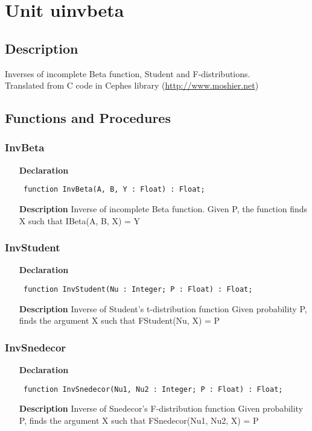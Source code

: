 \documentclass[12pt,a4paper,oneside]{report}
\newcommand{\declarationitem}[1]{\textbf{#1}}
\newcommand{\descriptiontitle}[1]{\textbf{#1}}
\newcommand{\code}[1]{\texttt{#1}}
\begin{document}
\section{Unit uinvbeta}
\label{uinvbeta}
\subsection{Description}
Inverses of incomplete Beta function, Student and F{-}distributions.\\
Translated from C code in Cephes library (\href{http://www.moshier.net}{http://www.moshier.net}) 
\subsection{Functions and Procedures}
\subsubsection{InvBeta}
\label{uinvbeta-InvBeta}
\begin{itemize}\item[\declarationitem{Declaration}\hfill]
	\begin{flushleft}
		\code{
			function InvBeta(A, B, Y : Float) : Float;}
	\end{flushleft}
	\par
	\item[\descriptiontitle{Description}]
	Inverse of incomplete Beta function. Given P, the function finds X such that IBeta(A, B, X) = Y
\end{itemize}
\subsubsection{InvStudent}
\label{uinvbeta-InvStudent}
\begin{itemize}\item[\declarationitem{Declaration}\hfill]
	\begin{flushleft}
		\code{
			function InvStudent(Nu : Integer; P : Float) : Float;}
	\end{flushleft}
	\item[\descriptiontitle{Description}]
	Inverse of Student's t{-}distribution function Given probability P, finds the argument X such that FStudent(Nu, X) = P
\end{itemize}
\subsubsection{InvSnedecor}
\label{uinvbeta-InvSnedecor}
\begin{itemize}\item[\declarationitem{Declaration}\hfill]
	\begin{flushleft}
		\code{
			function InvSnedecor(Nu1, Nu2 : Integer; P : Float) : Float;}
	\end{flushleft}
	\item[\descriptiontitle{Description}]
	Inverse of Snedecor's F{-}distribution function Given probability P, finds the argument X such that FSnedecor(Nu1, Nu2, X) = P
\end{itemize}
\end{document}
